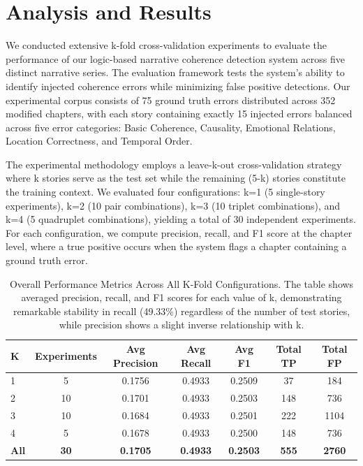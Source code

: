 
\section{Analysis and Results}

We conducted extensive k-fold cross-validation experiments to evaluate the performance of our logic-based narrative coherence detection system across five distinct narrative series. The evaluation framework tests the system's ability to identify injected coherence errors while minimizing false positive detections. Our experimental corpus consists of 75 ground truth errors distributed across 352 modified chapters, with each story containing exactly 15 injected errors balanced across five error categories: Basic Coherence, Causality, Emotional Relations, Location Correctness, and Temporal Order.

The experimental methodology employs a leave-k-out cross-validation strategy where k stories serve as the test set while the remaining (5-k) stories constitute the training context. We evaluated four configurations: k=1 (5 single-story experiments), k=2 (10 pair combinations), k=3 (10 triplet combinations), and k=4 (5 quadruplet combinations), yielding a total of 30 independent experiments. For each configuration, we compute precision, recall, and F1 score at the chapter level, where a true positive occurs when the system flags a chapter containing a ground truth error.

\begin{table}[htbp]
\centering
\caption{Overall Performance Metrics Across All K-Fold Configurations. The table shows averaged precision, recall, and F1 scores for each value of k, demonstrating remarkable stability in recall (49.33\%) regardless of the number of test stories, while precision shows a slight inverse relationship with k.}
\label{tab:overall_metrics}
\begin{tabular}{lcccccc}
\toprule
\textbf{K} & \textbf{Experiments} & \textbf{Avg Precision} & \textbf{Avg Recall} & \textbf{Avg F1} & \textbf{Total TP} & \textbf{Total FP} \\
\midrule
1 & 5  & 0.1756 & 0.4933 & 0.2509 & 37 & 184 \\
2 & 10 & 0.1701 & 0.4933 & 0.2503 & 148 & 736 \\
3 & 10 & 0.1684 & 0.4933 & 0.2501 & 222 & 1104 \\
4 & 5  & 0.1678 & 0.4933 & 0.2500 & 148 & 736 \\
\midrule
\textbf{All} & \textbf{30} & \textbf{0.1705} & \textbf{0.4933} & \textbf{0.2503} & \textbf{555} & \textbf{2760} \\
\bottomrule
\end{tabular}
\end{table}

